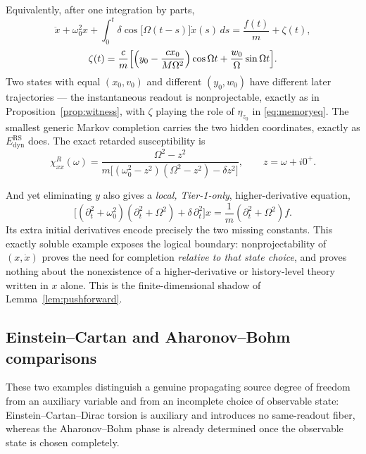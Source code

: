 \documentclass[11pt,a4paper]{article}
\theoremstyle{plain}
\theoremstyle{definition}
\newcommand{\RS}{\mathrm{RS}}
\begin{document}
Equivalently, after one integration by parts,
\begin{equation}
\label{eq:oscGLE}
\boxed{\;
\ddot x+\omega_0^2x
+\int_0^t\delta\cos\bigl[\Omega(t-s)\bigr]\dot x(s)\,ds
=\frac{f(t)}{m}+\zeta(t),
\;}
\end{equation}
\begin{equation}
\label{eq:oscnoise}
\zeta(t)=\frac{c}{m}
\Bigl[\Bigl(y_0-\frac{cx_0}{M\Omega^2}\Bigr)\cos\Omega t
+\frac{w_0}{\Omega}\sin\Omega t\Bigr].
\end{equation}
Two states with equal $(x_0,v_0)$ and different $(y_0,w_0)$ have
different later trajectories --- the instantaneous readout is
nonprojectable, exactly as in Proposition~\ref{prop:witness}, with
$\zeta$ playing the role of $\eta_{z_0}$ in \eqref{eq:memoryeq}. The
smallest generic Markov completion carries the two hidden coordinates,
exactly as $E^{\RS}_{\mathrm{dyn}}$ does. The exact retarded
susceptibility is
\begin{equation}
\label{eq:chi}
\boxed{\;
\chi^R_{xx}(\omega)
=\frac{\Omega^2-z^2}
{m\bigl[(\omega_0^2-z^2)(\Omega^2-z^2)-\delta z^2\bigr]},
\qquad z=\omega+i0^+ .
\;}
\end{equation}

And yet eliminating $y$ also gives a \emph{local, Tier-1-only},
higher-derivative equation,
\begin{equation}
\label{eq:oscfourth}
\boxed{\;
\bigl[(\partial_t^2+\omega_0^2)(\partial_t^2+\Omega^2)
+\delta\,\partial_t^2\bigr]x
=\frac1m(\partial_t^2+\Omega^2)f .
\;}
\end{equation}
Its extra initial derivatives encode precisely the two missing constants.
This exactly soluble example exposes the logical boundary: nonprojectability
of $(x,\dot x)$ proves the need for completion \emph{relative to that
state choice}, and proves nothing about the nonexistence of a
higher-derivative or history-level theory written in $x$ alone. This is
the finite-dimensional shadow of Lemma~\ref{lem:pushforward}.

\subsection{Einstein--Cartan and Aharonov--Bohm comparisons}
\label{sec:countercontrols}

These two examples distinguish a genuine propagating source degree of
freedom from an auxiliary variable and from an incomplete choice of
observable state: Einstein--Cartan--Dirac torsion is auxiliary and
introduces no same-readout fiber, whereas the Aharonov--Bohm phase is
already determined once the observable state is chosen completely.
\end{document}
